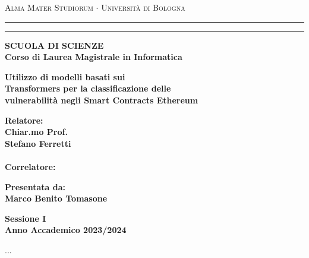 \documentclass[12pt,a4paper]{report}
\newenvironment{dedication}
{%
\thispagestyle{empty}%
\vspace*{\stretch{1}}%
\itshape             %
\raggedleft          %
}
{\par %
\vspace{\stretch{3}} %
\clearpage           %
}
\begin{document}
\begin{titlepage}
    \begin{center}
    {{\Large{\textsc{Alma Mater Studiorum $\cdot$ Universit\`a di
    Bologna}}}} \rule[0.1cm]{15.8cm}{0.1mm}
    \rule[0.5cm]{15.8cm}{0.6mm}
    {\small{\bf SCUOLA DI SCIENZE\\
    Corso di Laurea Magistrale in Informatica }}
    \end{center}
    \vspace{15mm}
    \begin{center}
    {\LARGE{\bf Utilizzo di modelli basati sui }}\\
    \vspace{3mm}
    {\LARGE{\bf Transformers per la classificazione delle }}\\
    \vspace{3mm}
    {\LARGE{\bf  vulnerabilità negli Smart Contracts Ethereum}}\\
    \end{center}
    \vspace{40mm}
    \par
    \noindent
    \begin{minipage}[t]{0.47\textwidth}
    {\large{\bf Relatore:\\
    Chiar.mo Prof.\\
    Stefano Ferretti\\
    \\
    Correlatore:\\
    }}
    \end{minipage}
    \hfill
    \begin{minipage}[t]{0.47\textwidth}\raggedleft
    {\large{\bf Presentata da:\\
    Marco Benito Tomasone}}
    \end{minipage}
    \vspace{20mm}
    \begin{center}
    {\large{\bf Sessione I\\%
    Anno Accademico 2023/2024}}%
    \end{center}
    \end{titlepage}

    \begin{dedication}
       ...
    \end{dedication}
    \tableofcontents
    \listoffigures
    \listoftables
    











\nocite{*}


\end{document}
